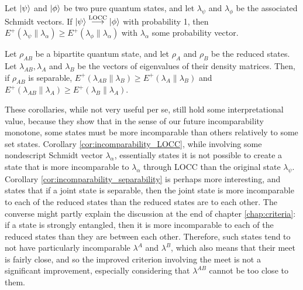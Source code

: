 \begin{corollary} \label{cor:incomparability_LOCC}
    Let $\ket{\psi}$ and $\ket{\phi}$ be two pure quantum states, and let $\lambda_\psi$ and $\lambda_\phi$ be the associated Schmidt vectors. If $\ket{\psi} \overset{\text{LOCC}}{\longrightarrow} \ket{\phi}$ with probability 1, then $E^+ (\lambda_\psi \parallel \lambda_\alpha) \geq E^+ (\lambda_\phi \parallel \lambda_\alpha)$ with $\lambda_\alpha$ some probability vector.
\end{corollary}

\begin{corollary} \label{cor:incomparability_separability}
    Let $\rho_{AB}$ be a bipartite quantum state, and let $\rho_A$ and $\rho_B$ be the reduced states. Let $\lambda_{AB}, \lambda_A$ and $\lambda_B$ be the vectors of eigenvalues of their density matrices. Then, if $\rho_{AB}$ is separable, $E^+ (\lambda_{AB} \parallel \lambda_B) \geq E^+ (\lambda_A \parallel \lambda_B)$ and $E^+ (\lambda_{AB} \parallel \lambda_A) \geq E^+ (\lambda_B \parallel \lambda_A)$.
\end{corollary}

These corollaries, while not very useful per se, still hold some interpretational value, because they show that in the sense of our future incomparability monotone, some states must be more incomparable than others relatively to some set states. Corollary \ref{cor:incomparability_LOCC}, while involving some nondescript Schmidt vector $\lambda_\alpha$, essentially states it is not possible to create a state that is more incomparable to $\lambda_\alpha$ through LOCC than the original state $\lambda_\psi$. Corollary \ref{cor:incomparability_separability} is perhaps more interesting, and states that if a joint state is separable, then the joint state is more incomparable to each of the reduced states than the reduced states are to each other. The converse might partly explain the discussion at the end of chapter \ref{chap:criteria}: if a state is strongly entangled, then it is more incomparable to each of the reduced states than they are between each other. Therefore, such states tend to not have particularly incomparable $\lambda^A$ and $\lambda^B$, which also means that their meet is fairly close, and so the improved criterion involving the meet is not a significant improvement, especially considering that $\lambda^{AB}$ cannot be too close to them.

